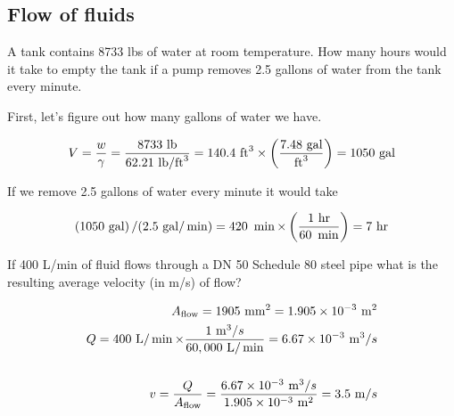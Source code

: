\documentclass[multi,preview,varwidth=false,border=5,12pt]{standalone}
\begin{document}
\begin{center}
\section*{Flow of fluids}
\end{center}

\begin{question}

A tank contains 8733 lbs of water at room temperature. How many hours would it take to empty the tank if a pump removes 2.5 gallons of water from the tank every minute.

\begin{solution}

First, let's figure out how many gallons of water we have.

\begin{align*}
    V=\frac{w}{\gamma}=\frac{8733~\mathrm{lb}}{62.21~\mathrm{lb}/\mathrm{ft}^3}=140.4~\mathrm{ft}^3\times\left(\frac{7.48~\mathrm{gal}}{\mathrm{ft}^3}\right)=1050~\mathrm{gal}
\end{align*}

If we remove 2.5 gallons of water every minute it would take

\begin{align*}
    \left(1050~\mathrm{gal}\right)/(2.5~\mathrm{gal}/\min) = 420 ~\min \times \left(\frac{1~\mathrm{hr}}{60~\min}\right)=7~\mathrm{hr}
\end{align*}

\end{solution}

\end{question}


\begin{question}

If 400 L/min of fluid flows through a DN 50 Schedule 80 steel pipe what is the resulting average velocity (in m/s) of flow?

\begin{solution}
\begin{align*}
A_{\rm flow}=1905~\mathrm{mm}^2=1.905\times 10^{-3}~\mathrm{m}^2\\
Q=400~\mathrm{L}/\min \times \frac{1~\mathrm{m}^3/s}{60,000~\mathrm{L}/\min} = 6.67\times 10^{-3}~\mathrm{m}^3/s\\
\\
v=\frac{Q}{A_{\rm flow}}=\frac{6.67\times 10^{-3}~\mathrm{m}^3/s}{1.905\times 10^{-3} ~\mathrm{m}^2}=3.5~\mathrm{m}/s
\end{align*}
\end{solution}

\end{question}
\end{document}
